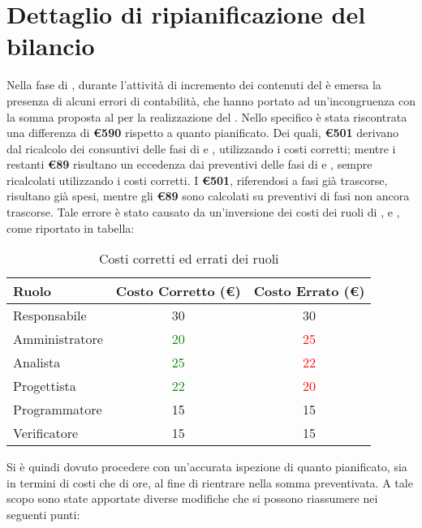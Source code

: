 \section{Dettaglio di ripianificazione del bilancio}\label{detRevBilancio}
Nella fase di \fC, durante l'attività di incremento dei contenuti del \PP è emersa la presenza di alcuni errori di contabilità, che hanno portato ad un'incongruenza con la somma proposta al  per la realizzazione del .
Nello specifico è stata riscontrata una differenza di \textbf{\euro590} rispetto a quanto pianificato.
Dei quali, \textbf{\euro501} derivano dal ricalcolo dei consuntivi delle fasi di \fPA e \fPD, utilizzando i costi corretti; mentre i restanti \textbf{\euro89} risultano un eccedenza dai preventivi delle fasi di \fC e \fVV, sempre ricalcolati utilizzando i costi corretti. I \textbf{\euro501}, riferendosi a fasi già trascorse, risultano già spesi, mentre gli \textbf{\euro89} sono calcolati su preventivi di fasi non ancora trascorse.
Tale errore è stato causato da un'inversione dei costi dei ruoli di \rAP, \rA e \rP, come riportato in tabella:
\begin{table}[h]
\begin{center}
\begin{tabular}{|l|c|c|}
\hline Ruolo & Costo Corretto (\euro) & Costo Errato (\euro) \\
\hline
Responsabile & 30 & 30 \\
Amministratore & \textcolor{Green}{20} & \textcolor{red}{25}\\
Analista & \textcolor{Green}{25} & \textcolor{red}{22}\\
Progettista & \textcolor{Green}{22} &\textcolor{red}{20}\\
Programmatore & 15 & 15\\
Verificatore & 15 & 15\\
\hline
\end{tabular}
\caption{Costi corretti ed errati dei ruoli}
\end{center}
\end{table}
\FloatBarrier
Si è quindi dovuto procedere con un'accurata ispezione di quanto pianificato, sia in termini di costi che di ore, al fine di rientrare nella somma preventivata.
A tale scopo sono state apportate diverse modifiche che si possono riassumere nei seguenti punti:
